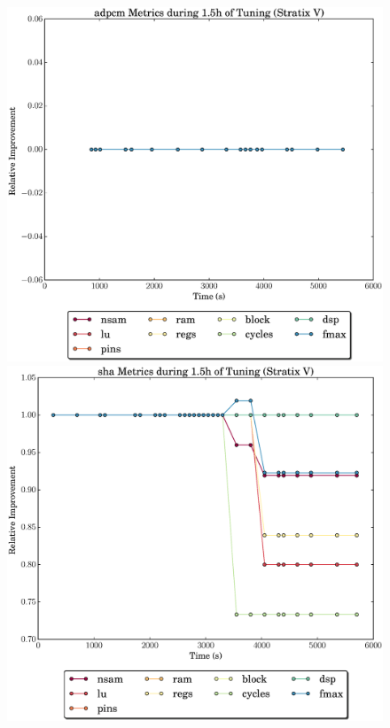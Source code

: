 \documentclass[12pt, a4paper]{article}
\begin{document}
\begin{figure}[htpb]
    \begin{minipage}{.48\textwidth}
        \includegraphics[scale=.29]{adpcm_all_5400_chstone_StratixV}
    \end{minipage}%
    \hfill
    \begin{minipage}{.48\textwidth}
        \includegraphics[scale=.29]{sha_all_5400_chstone_StratixV}
    \end{minipage}%


\end{figure}
\end{document}
